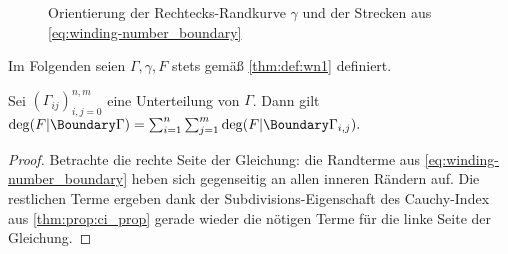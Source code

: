 \documentclass{mythesis}
\begin{document}
\begin{figure}[ht]
    \centering
    \caption{Orientierung der Rechtecks-Randkurve $\gamma$ und der Strecken aus \eqref{eq:winding-number_boundary}}
    \label{fig:rectboundary}
\end{figure}

Im Folgenden seien $\Gamma, \gamma, F$ stets gemäß \ref{thm:def:wn1} definiert.


\begin{proposition}[Subdivision] \label{thm:winding-number_subdivision}
    Sei $(\Gamma_{ij})_{i,j=0}^{n,m}$ eine Unterteilung von $\Gamma$.
    Dann gilt
    \begin{math}
        \deg(F|\Boundary\Gamma) = \sum_{i=1}^n \sum_{j=1}^m \deg(F|\Boundary\Gamma_{i,j}).
    \end{math}
    \begin{proof}
        Betrachte die rechte Seite der Gleichung: die Randterme aus \eqref{eq:winding-number_boundary} heben sich gegenseitig an allen inneren Rändern auf.
        Die restlichen Terme ergeben dank der Subdivisions-Eigenschaft des Cauchy-Index aus \ref{thm:prop:ci_prop} gerade wieder die nötigen Terme für die linke Seite der Gleichung.
    \end{proof}
\end{proposition}
\end{document}
